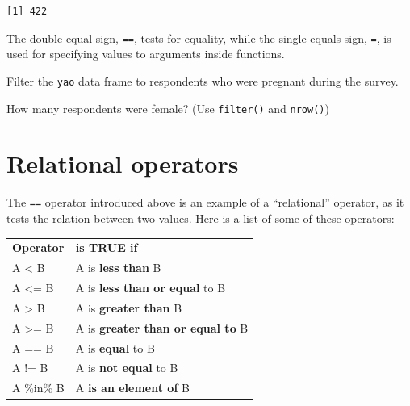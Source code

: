 \documentclass[
  letterpaper,
  DIV=11,
  numbers=noendperiod]{scrreprt}
\begin{document}
\begin{verbatim}
[1] 422
\end{verbatim}

\begin{tcolorbox}[enhanced jigsaw, titlerule=0mm, colback=white, left=2mm, breakable, opacitybacktitle=0.6, colbacktitle=quarto-callout-note-color!10!white, colframe=quarto-callout-note-color-frame, bottomtitle=1mm, opacityback=0, coltitle=black, arc=.35mm, toptitle=1mm, title=\textcolor{quarto-callout-note-color}{\faInfo}\hspace{0.5em}{Key Point}, leftrule=.75mm, toprule=.15mm, bottomrule=.15mm, rightrule=.15mm]

The double equal sign, \texttt{==}, tests for equality, while the single
equals sign, \texttt{=}, is used for specifying values to arguments
inside functions.

\end{tcolorbox}

\begin{tcolorbox}[enhanced jigsaw, titlerule=0mm, colback=white, left=2mm, breakable, opacitybacktitle=0.6, colbacktitle=quarto-callout-tip-color!10!white, colframe=quarto-callout-tip-color-frame, bottomtitle=1mm, opacityback=0, coltitle=black, arc=.35mm, toptitle=1mm, title=\textcolor{quarto-callout-tip-color}{\faLightbulb}\hspace{0.5em}{Practice}, leftrule=.75mm, toprule=.15mm, bottomrule=.15mm, rightrule=.15mm]

Filter the \texttt{yao} data frame to respondents who were pregnant
during the survey.

How many respondents were female? (Use \texttt{filter()} and
\texttt{nrow()})

\end{tcolorbox}

\section{Relational operators}\label{relational-operators}

The \texttt{==} operator introduced above is an example of a
``relational'' operator, as it tests the relation between two values.
Here is a list of some of these operators:

\begin{longtable}[]{@{}ll@{}}
\toprule\noalign{}
\endhead
\bottomrule\noalign{}
\endlastfoot
\textbf{Operator} & \textbf{is TRUE if} \\
A \textless{} B & A is \textbf{less than} B \\
A \textless= B & A is \textbf{less than or equal} to B \\
A \textgreater{} B & A is \textbf{greater than} B \\
A \textgreater= B & A is \textbf{greater than or equal to} B \\
A == B & A is \textbf{equal} to B \\
A != B & A is \textbf{not equal} to B \\
A \%in\% B & A \textbf{is an element of} B \\
\end{longtable}
\end{document}
